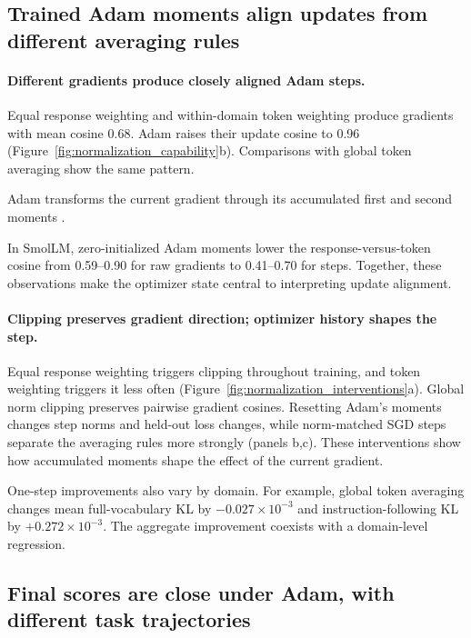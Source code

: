 \subsection{Trained Adam moments align updates from different averaging rules}

\paragraph{Different gradients produce closely aligned Adam steps.}
Equal response weighting and within-domain token weighting produce gradients with mean cosine 0.68. Adam raises their update cosine to 0.96 (Figure~\ref{fig:normalization_capability}b). Comparisons with global token averaging show the same pattern.



Adam transforms the current gradient through its accumulated first and second moments \citep{kingma2015adam}.

In SmolLM, zero-initialized Adam moments lower the response-versus-token cosine from 0.59--0.90 for raw gradients to 0.41--0.70 for steps. Together, these observations make the optimizer state central to interpreting update alignment.

\paragraph{Clipping preserves gradient direction; optimizer history shapes the step.}
Equal response weighting triggers clipping throughout training, and token weighting triggers it less often (Figure~\ref{fig:normalization_interventions}a). Global norm clipping preserves pairwise gradient cosines. Resetting Adam's moments changes step norms and held-out loss changes, while norm-matched SGD steps separate the averaging rules more strongly (panels b,c). These interventions show how accumulated moments shape the effect of the current gradient.

One-step improvements also vary by domain. For example, global token averaging changes mean full-vocabulary KL by $-0.027\times10^{-3}$ and instruction-following KL by $+0.272\times10^{-3}$. The aggregate improvement coexists with a domain-level regression.



\subsection{Final scores are close under Adam, with different task trajectories}

